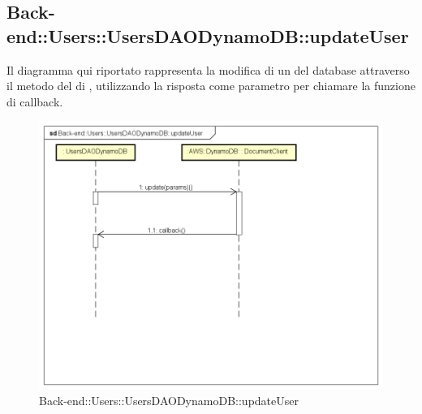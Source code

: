 \subsection{Back-end::Users::UsersDAODynamoDB::updateUser}
Il diagramma qui riportato rappresenta la modifica di un  del database attraverso il metodo  del  di , utilizzando la risposta come parametro per chiamare la funzione di callback.
\begin{figure}[h] \centering \includegraphics[width=\textwidth,height=\textheight,keepaspectratio]{images/diagrams/back-end/Ufficial_Backend/Back-endUsersUsersDAODynamoDBupdateUser.png} 	\caption{Back-end::Users::UsersDAODynamoDB::updateUser}
\end{figure}
\newpage


